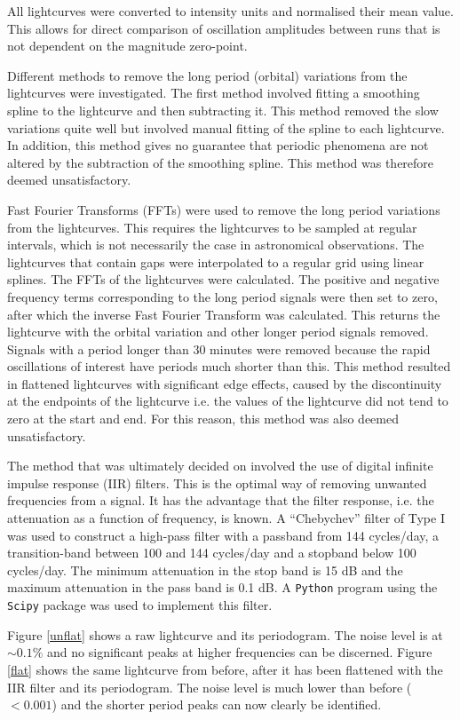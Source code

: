 All lightcurves were converted to intensity units and normalised their mean value. This allows for direct comparison of oscillation amplitudes between runs that is not dependent on the magnitude zero-point.

Different methods to remove the long period (orbital) variations from the lightcurves were investigated. The first method involved fitting a smoothing spline to the lightcurve and then subtracting it. This method removed the slow variations quite well but involved manual fitting of the spline to each lightcurve. In addition, this method gives no guarantee that periodic phenomena are not altered by the subtraction of the smoothing spline. This method was therefore deemed unsatisfactory.

Fast Fourier Transforms (FFTs) were used to remove the long period variations from the lightcurves. This requires the lightcurves to be sampled at regular intervals, which is not necessarily the case in astronomical observations. The lightcurves that contain gaps were interpolated to a regular grid using linear splines. The FFTs of the lightcurves were calculated. The positive and negative frequency terms corresponding to the long period signals were then set to zero, after which the inverse Fast Fourier Transform was calculated. This returns the lightcurve with the orbital variation and other longer period signals removed. Signals with a period longer than 30 minutes were removed because the rapid oscillations of interest have periods much shorter than this. This method resulted in flattened lightcurves with significant edge effects, caused by the discontinuity at the endpoints of the lightcurve i.e. the values of the lightcurve did not tend to zero at the start and end. For this reason, this method was also deemed unsatisfactory.

The method that was ultimately decided on involved the use of digital infinite impulse response (IIR) filters. This is the optimal way of removing unwanted frequencies from a signal. It has the advantage that the filter response, i.e. the attenuation as a function of frequency, is known. A ``Chebychev'' filter of Type I was used to construct a high-pass filter with a passband from 144 cycles/day, a transition-band between 100 and 144 cycles/day and a stopband below 100 cycles/day. The minimum attenuation in the stop band is 15 dB and the maximum attenuation in the pass band is 0.1 dB. A \texttt{Python} program using the \texttt{Scipy} package was used to implement this filter.

Figure \ref{unflat} shows a raw lightcurve and its periodogram. The noise level is at $\sim 0.1\%$ and no significant peaks at higher frequencies can be discerned. Figure \ref{flat} shows the same lightcurve from before, after it has been flattened with the IIR filter and its periodogram. The noise level is much lower than before ($< 0.001$) and the shorter period peaks can now clearly be identified.




